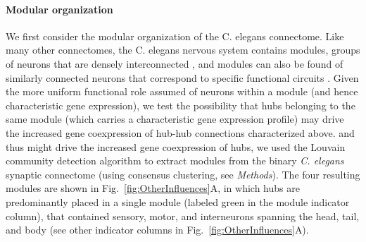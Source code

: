 \documentclass[10pt,letterpaper]{article}
\begin{document}
\paragraph{Modular organization}
We first consider the modular organization of the C. elegans connectome.
Like many other connectomes, the C. elegans nervous system contains modules, groups of neurons that are densely interconnected \cite{Kim2014, Bassett2010}, and modules can also be found of similarly connected neurons that correspond to specific functional circuits \cite{Achacoso:1992ay, Pavlovic2014}.
Given the more uniform functional role assumed of neurons within a module (and hence characteristic gene expression), we test the possibility that hubs belonging to the same module (which carries a characteristic gene expression profile) may drive the increased gene coexpression of hub-hub connections characterized above.
 and thus might drive the increased gene coexpression of hubs, we used the Louvain community detection algorithm to extract modules from the binary \emph{C. elegans} synaptic connectome (using consensus clustering, see \textit{Methods}).
The four resulting modules are shown in Fig.~\ref{fig:OtherInfluences}A, in which hubs are predominantly placed in a single module (labeled green in the module indicator column), that contained sensory, motor, and interneurons spanning the head, tail, and body (see other indicator columns in Fig.~\ref{fig:OtherInfluences}A).
\end{document}
